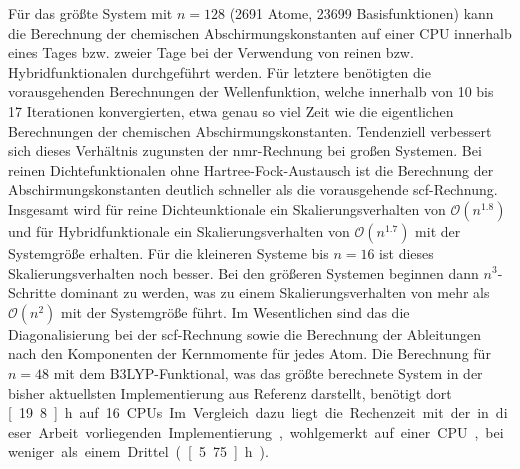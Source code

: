 \FloatBarrier

Für das größte System mit $n=128$ (2691 Atome, 23699 Basisfunktionen) kann die Berechnung der chemischen Abschirmungskonstanten auf einer CPU innerhalb eines Tages bzw. zweier Tage bei der Verwendung von reinen bzw. Hybridfunktionalen durchgeführt werden. Für letztere benötigten die vorausgehenden Berechnungen der Wellenfunktion, welche innerhalb von 10 bis 17 Iterationen konvergierten, etwa genau so viel Zeit wie die eigentlichen Berechnungen der chemischen Abschirmungskonstanten. Tendenziell verbessert sich dieses Verhältnis zugunsten der \ac{nmr}-Rechnung bei großen Systemen. Bei reinen Dichtefunktionalen ohne Hartree-Fock-Austausch ist die Berechnung der Abschirmungskonstanten deutlich schneller als die vorausgehende \ac{scf}-Rechnung. Insgesamt wird für reine Dichteunktionale ein Skalierungsverhalten von $\mathcal{O}(n^{1.8})$ und für Hybridfunktionale ein Skalierungsverhalten von $\mathcal{O}(n^{1.7})$ mit der Systemgröße erhalten. Für die kleineren Systeme bis $n=16$ ist dieses Skalierungsverhalten noch besser. Bei den größeren Systemen beginnen dann $n^3$-Schritte dominant zu werden, was zu einem Skalierungsverhalten von mehr als $\mathcal{O}(n^{2})$ mit der Systemgröße führt. Im Wesentlichen sind das die Diagonalisierung bei der \ac{scf}-Rechnung sowie die Berechnung der Ableitungen nach den Komponenten der Kernmomente für jedes Atom. Die Berechnung für $n=48$ mit dem B3LYP-Funktional, was das größte berechnete System in der bisher aktuellsten Implementierung aus Referenz \cite{kumar2016nuclei} darstellt, benötigt dort \unit[19.8]{h} auf 16 CPUs. Im Vergleich dazu liegt die Rechenzeit mit der in dieser Arbeit vorliegenden Implementierung, wohlgemerkt auf einer CPU, bei weniger als einem Drittel (\unit[5.75]{h}). 

